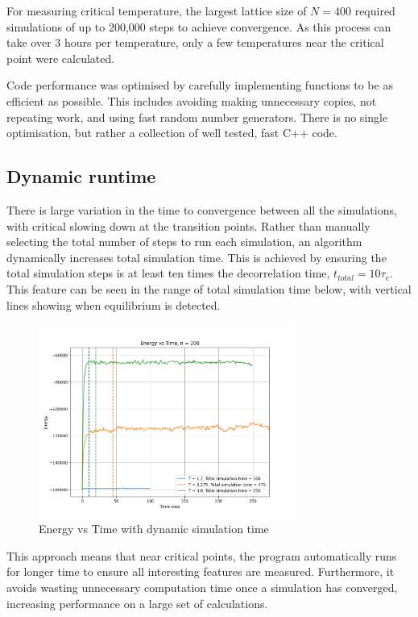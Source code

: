 \documentclass[a4paper, 12pt]{article}
\begin{document}
For measuring critical temperature, the largest lattice size of \( N = 400 \) required simulations of up to 200,000 steps to achieve convergence. As this process can take over 3 hours per temperature, only a few temperatures near the critical point were calculated.  

Code performance was optimised by carefully implementing functions to be as efficient as possible. This includes avoiding making unnecessary copies, not repeating work, and using fast random number generators. There is no single optimisation, but rather a collection of well tested, fast C++ code.


\subsection{Dynamic runtime}
There is large variation in the time to convergence between all the simulations, with critical slowing down at the transition points. Rather than manually selecting the total number of steps to run each simulation, an algorithm dynamically increases total simulation time. This is achieved by ensuring the total simulation steps is at least ten times the decorrelation time, \( t_{total} = 10 \tau_e \). This feature can be seen in the range of total simulation time below, with vertical lines showing when equilibrium is detected. 
\begin{figure}[H]
\centering
\includegraphics[width=0.75\textwidth]{./resources/energy_vs_time.png}
\caption{Energy vs Time with dynamic simulation time}
\end{figure}

This approach means that near critical points, the program automatically runs for longer time to ensure all interesting features are measured. Furthermore, it avoids wasting unnecessary computation time once a simulation has converged, increasing performance on a large set of calculations. 
\end{document}
